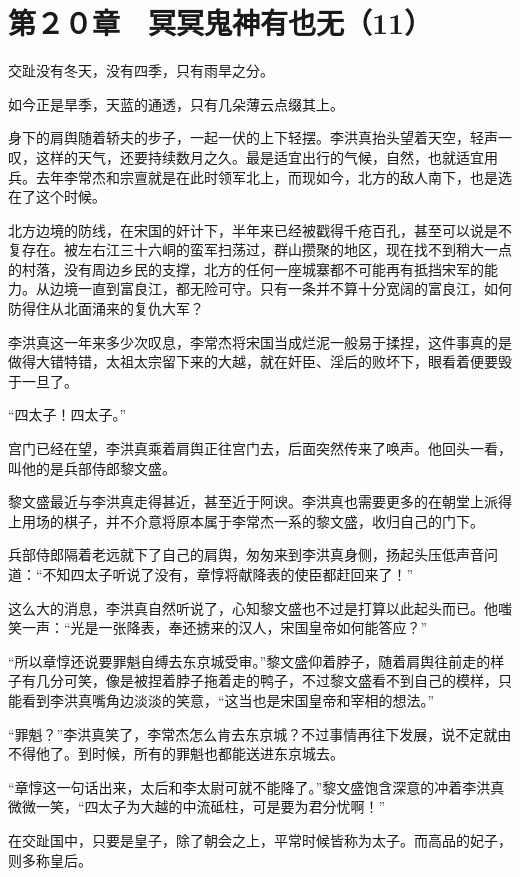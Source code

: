 \section{第２０章　冥冥鬼神有也无（11）}

交趾没有冬天，没有四季，只有雨旱之分。

如今正是旱季，天蓝的通透，只有几朵薄云点缀其上。

身下的肩舆随着轿夫的步子，一起一伏的上下轻摆。李洪真抬头望着天空，轻声一叹，这样的天气，还要持续数月之久。最是适宜出行的气候，自然，也就适宜用兵。去年李常杰和宗亶就是在此时领军北上，而现如今，北方的敌人南下，也是选在了这个时候。

北方边境的防线，在宋国的奸计下，半年来已经被戳得千疮百孔，甚至可以说是不复存在。被左右江三十六峒的蛮军扫荡过，群山攒聚的地区，现在找不到稍大一点的村落，没有周边乡民的支撑，北方的任何一座城寨都不可能再有抵挡宋军的能力。从边境一直到富良江，都无险可守。只有一条并不算十分宽阔的富良江，如何防得住从北面涌来的复仇大军？

李洪真这一年来多少次叹息，李常杰将宋国当成烂泥一般易于揉捏，这件事真的是做得大错特错，太祖太宗留下来的大越，就在奸臣、淫后的败坏下，眼看着便要毁于一旦了。

“四太子！四太子。”

宫门已经在望，李洪真乘着肩舆正往宫门去，后面突然传来了唤声。他回头一看，叫他的是兵部侍郎黎文盛。

黎文盛最近与李洪真走得甚近，甚至近于阿谀。李洪真也需要更多的在朝堂上派得上用场的棋子，并不介意将原本属于李常杰一系的黎文盛，收归自己的门下。

兵部侍郎隔着老远就下了自己的肩舆，匆匆来到李洪真身侧，扬起头压低声音问道：“不知四太子听说了没有，章惇将献降表的使臣都赶回来了！”

这么大的消息，李洪真自然听说了，心知黎文盛也不过是打算以此起头而已。他嗤笑一声：“光是一张降表，奉还掳来的汉人，宋国皇帝如何能答应？”

“所以章惇还说要罪魁自缚去东京城受审。”黎文盛仰着脖子，随着肩舆往前走的样子有几分可笑，像是被捏着脖子拖着走的鸭子，不过黎文盛看不到自己的模样，只能看到李洪真嘴角边淡淡的笑意，“这当也是宋国皇帝和宰相的想法。”

“罪魁？”李洪真笑了，李常杰怎么肯去东京城？不过事情再往下发展，说不定就由不得他了。到时候，所有的罪魁也都能送进东京城去。

“章惇这一句话出来，太后和李太尉可就不能降了。”黎文盛饱含深意的冲着李洪真微微一笑，“四太子为大越的中流砥柱，可是要为君分忧啊！”

在交趾国中，只要是皇子，除了朝会之上，平常时候皆称为太子。而高品的妃子，则多称皇后。

